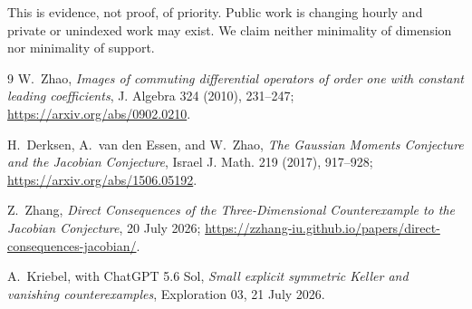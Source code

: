 \documentclass[11pt]{article}
\begin{document}
This is evidence, not proof, of priority. Public work is changing hourly and
private or unindexed work may exist. We claim neither minimality of dimension
nor minimality of support.

\begin{thebibliography}{9}
W.~Zhao,
\emph{Images of commuting differential operators of order one with constant
leading coefficients}, J. Algebra 324 (2010), 231--247;
\url{https://arxiv.org/abs/0902.0210}.

H.~Derksen, A.~van den Essen, and W.~Zhao,
\emph{The Gaussian Moments Conjecture and the Jacobian Conjecture},
Israel J. Math. 219 (2017), 917--928;
\url{https://arxiv.org/abs/1506.05192}.

Z.~Zhang,
\emph{Direct Consequences of the Three-Dimensional Counterexample to the
Jacobian Conjecture}, 20 July 2026;
\url{https://zzhang-iu.github.io/papers/direct-consequences-jacobian/}.

A.~Kriebel, with ChatGPT 5.6 Sol,
\emph{Small explicit symmetric Keller and vanishing counterexamples},
Exploration 03, 21 July 2026.
\end{thebibliography}
\end{document}
